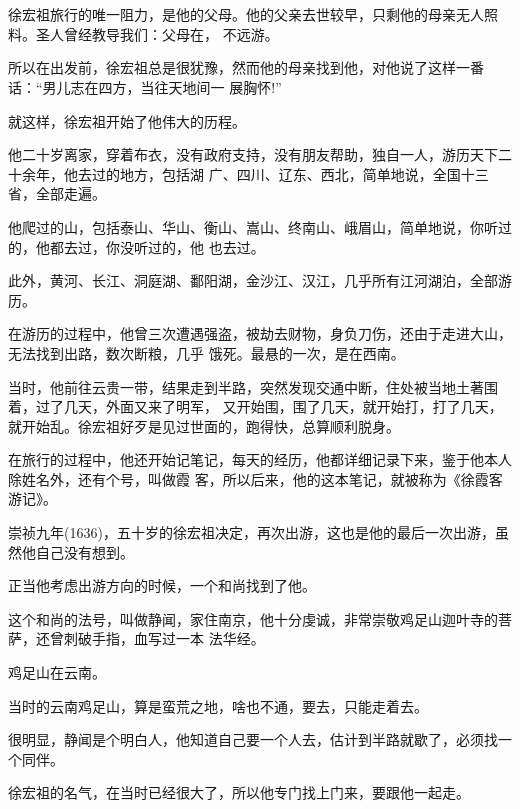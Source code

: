\documentclass[11pt,a4paper,onecolumn]{article}
\begin{document}
\section[\thesection]{}

徐宏祖旅行的唯一阻力，是他的父母。他的父亲去世较早，只剩他的母亲无人照料。圣人曾经教导我们：父母在，
不远游。

所以在出发前，徐宏祖总是很犹豫，然而他的母亲找到他，对他说了这样一番话：``男儿志在四方，当往天地间一
展胸怀!''

就这样，徐宏祖开始了他伟大的历程。

他二十岁离家，穿着布衣，没有政府支持，没有朋友帮助，独自一人，游历天下二十余年，他去过的地方，包括湖
广、四川、辽东、西北，简单地说，全国十三省，全部走遍。

他爬过的山，包括泰山、华山、衡山、嵩山、终南山、峨眉山，简单地说，你听过的，他都去过，你没听过的，他
也去过。

此外，黄河、长江、洞庭湖、鄱阳湖，金沙江、汉江，几乎所有江河湖泊，全部游历。

在游历的过程中，他曾三次遭遇强盗，被劫去财物，身负刀伤，还由于走进大山，无法找到出路，数次断粮，几乎
饿死。最悬的一次，是在西南。

当时，他前往云贵一带，结果走到半路，突然发现交通中断，住处被当地土著围着，过了几天，外面又来了明军，
又开始围，围了几天，就开始打，打了几天，就开始乱。徐宏祖好歹是见过世面的，跑得快，总算顺利脱身。

在旅行的过程中，他还开始记笔记，每天的经历，他都详细记录下来，鉴于他本人除姓名外，还有个号，叫做霞
客，所以后来，他的这本笔记，就被称为《徐霞客游记》。

崇祯九年(1636)，五十岁的徐宏祖决定，再次出游，这也是他的最后一次出游，虽然他自己没有想到。

正当他考虑出游方向的时候，一个和尚找到了他。

这个和尚的法号，叫做静闻，家住南京，他十分虔诚，非常崇敬鸡足山迦叶寺的菩萨，还曾刺破手指，血写过一本
法华经。

鸡足山在云南。

当时的云南鸡足山，算是蛮荒之地，啥也不通，要去，只能走着去。

很明显，静闻是个明白人，他知道自己要一个人去，估计到半路就歇了，必须找一个同伴。

徐宏祖的名气，在当时已经很大了，所以他专门找上门来，要跟他一起走。

\section[\thesection]{}
\end{document}
